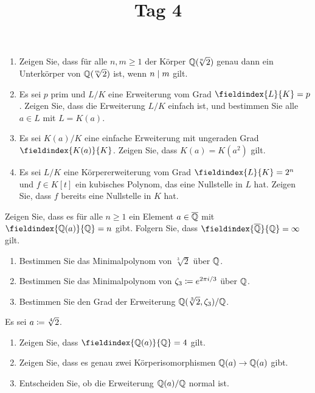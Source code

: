 \documentclass[a4paper, 10pt]{scrartcl}
\title{Tag 4}
\author{}
\date{}
\begin{document}
\begin{question}
  \begin{enumerate}
    \item
      Zeigen Sie, dass für alle $n, m \geq 1$ der Körper $\mathbb{Q}(\!\sqrt[n]{2})$ genau dann ein Unterkörper von $\mathbb{Q}(\!\sqrt[m]{2})$ ist, wenn $n \mathrel{|} m$ gilt.
    \item 
      Es sei $p$ prim und $L/K$ eine Erweiterung vom Grad $\fieldindex{L}{K} = p$.
      Zeigen Sie, dass die Erweiterung $L/K$ einfach ist, und bestimmen Sie alle $a \in L$ mit $L = K(a)$.
    \item
      Es sei $K(a)/K$ eine einfache Erweiterung mit ungeraden Grad $\fieldindex{K(a)}{K}$.
      Zeigen Sie, dass $K(a) = K(a^2)$ gilt.
    \item
      Es sei $L/K$ eine Körpererweiterung vom Grad $\fieldindex{L}{K} = 2^n$ und $f \in K[t]$ ein kubisches Polynom, das eine Nullstelle in $L$ hat.
      Zeigen Sie, dass $f$ bereits eine Nullstelle in $K$ hat.
  \end{enumerate}


\end{question}

\begin{question}
  Zeigen Sie, dass es für alle $n \geq 1$ ein Element $a \in \overline{\mathbb{Q}}$ mit $\fieldindex{\Rational(a)}{\Rational} = n$ gibt.
  Folgern Sie, dass $\fieldindex{\closure{\Rational}}{\Rational} = \infty$ gilt.
\end{question}

\begin{question}
  \begin{enumerate}
    \item
      Bestimmen Sie das Minimalpolynom von $\sqrt[3]{2}$ über $\mathbb{Q}$.
    \item
      Bestimmen Sie das Minimalpolynom von  $\zeta_3 \coloneqq e^{2 \pi i/3}$ über $\mathbb{Q}$.
    \item
      Bestimmen Sie den Grad der Erweiterung $\mathbb{Q}(\sqrt[3]{2}, \zeta_3)/\mathbb{Q}$.
  \end{enumerate}
\end{question}

\begin{question}
  Es sei $a \coloneqq \sqrt[4]{2}$.
  \begin{enumerate}
    \item
      Zeigen Sie, dass $\fieldindex{\Rational(a)}{\Rational} = 4$ gilt.
    \item
      Zeigen Sie, dass es genau zwei Körperisomorphismen $\mathbb{Q}(a) \to \mathbb{Q}(a)$ gibt.
    \item
      Entscheiden Sie, ob die Erweiterung $\mathbb{Q}(a)/\mathbb{Q}$ normal ist.
  \end{enumerate}
\end{question}
\end{document}
